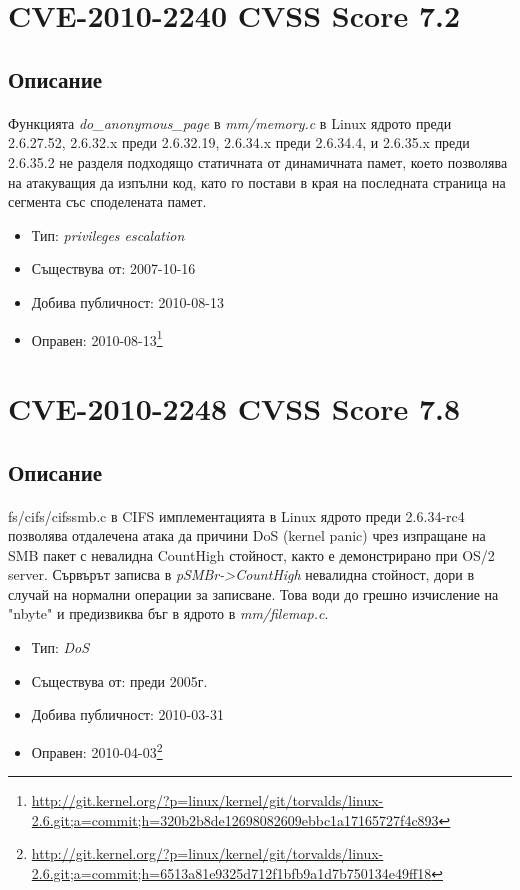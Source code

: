 \documentclass[a4paper,12pt,leqno]{article}
\begin{document}
\section{CVE-2010-2240 CVSS Score 7.2}
\subsection{Описание}
\paragraph{}
Функцията \textit{do\_anonymous\_page} в \textit{mm/memory.c} в Linux ядрото преди 2.6.27.52, 2.6.32.x преди 2.6.32.19, 2.6.34.x преди 2.6.34.4, и 2.6.35.x преди 2.6.35.2 не разделя подходящо статичната от динамичната памет, което позволява на атакуващия да изпълни код, като го постави в края на последната страница на сегмента със споделената памет.

\begin{itemize}
    \item Тип: \textit{privileges escalation}
    \item Съществува от: 2007-10-16
  	\item Добива публичност: 2010-08-13
    \item Оправен: 2010-08-13\footnote{\url{http://git.kernel.org/?p=linux/kernel/git/torvalds/linux-2.6.git;a=commit;h=320b2b8de12698082609ebbc1a17165727f4c893}}
\end{itemize}

\section{CVE-2010-2248 CVSS Score 7.8}
\subsection{Описание}
\paragraph{}
fs/cifs/cifssmb.c в CIFS имплементацията в Linux ядрото преди 2.6.34-rc4 позволява отдалечена атака да причини DoS (kernel panic) чрез изпращане на SMB пакет с невалидна CountHigh стойност, както е демонстрирано при OS/2 server. Сървърът записва в \textit{pSMBr->CountHigh} невалидна стойност, дори в случай на нормални операции за записване. Това води до грешно изчисление на "nbyte" и предизвиква бъг в ядрото в \textit{mm/filemap.c}.


\begin{itemize}
    \item Тип: \textit{DoS}
    \item Съществува от: преди 2005г.
  	\item Добива публичност: 2010-03-31
    \item Оправен: 2010-04-03\footnote{\url{http://git.kernel.org/?p=linux/kernel/git/torvalds/linux-2.6.git;a=commit;h=6513a81e9325d712f1bfb9a1d7b750134e49ff18}}
\end{itemize}
\end{document}

